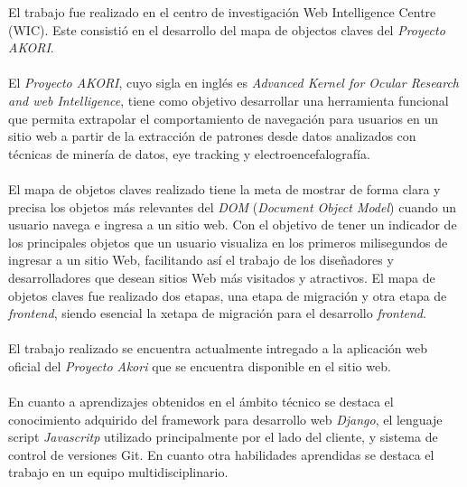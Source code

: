 \documentclass[letterpaper,11pt]{article} %
\begin{document}







\begin{resumen}
	El trabajo fue realizado en el centro de investigación Web Intelligence Centre (WIC). Este consistió en el desarrollo del mapa de objectos claves del \textit{Proyecto AKORI}. \\ \\
	El \textit{Proyecto AKORI}, cuyo sigla en inglés es \textit{Advanced Kernel for Ocular Research and web Intelligence}, tiene como objetivo desarrollar una herramienta funcional que permita extrapolar el comportamiento de navegación para usuarios en un sitio web a partir de la extracción
de patrones desde datos analizados con técnicas de minería de datos, eye tracking y electroencefalografía. \\ \\
	El mapa de objetos claves realizado tiene la meta de mostrar de forma clara y precisa los objetos más relevantes del \textit{DOM} (\textit{Document Object Model}) cuando un usuario navega e ingresa a un sitio web. Con el objetivo de tener un indicador de los principales objetos que un usuario visualiza en los primeros milisegundos de ingresar a un sitio Web, facilitando así el trabajo de los diseñadores y desarrolladores que desean sitios Web más visitados y atractivos. El mapa de objetos claves fue realizado dos etapas, una etapa de migración y otra etapa de \textit{frontend}, siendo esencial la xetapa de migración para el desarrollo \textit{frontend}. \\ \\
	El trabajo realizado se encuentra actualmente intregado a la aplicación web oficial del \textit{Proyecto Akori} que se encuentra disponible en el sitio web. \\ \\
	En cuanto a aprendizajes obtenidos en el ámbito técnico se destaca el conocimiento adquirido del framework para desarrollo web \textit{Django}, el lenguaje script \textit{Javascritp} utilizado principalmente por el lado del cliente, y sistema de control de versiones Git. En cuanto otra habilidades aprendidas se destaca el trabajo en un equipo multidisciplinario.
\end{resumen}






\end{document}
